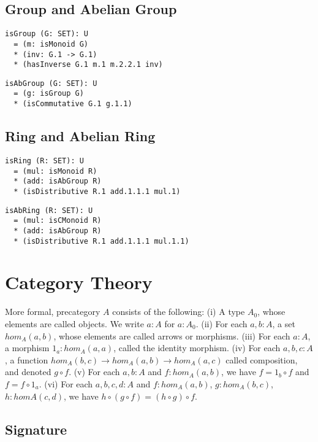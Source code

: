 \documentclass{article}
\begin{document}
\subsection{Group and Abelian Group}

\begin{lstlisting}[mathescape=true]
isGroup (G: SET): U
  = (m: isMonoid G)
  * (inv: G.1 -> G.1)
  * (hasInverse G.1 m.1 m.2.2.1 inv)
\end{lstlisting}

\begin{lstlisting}[mathescape=true]
isAbGroup (G: SET): U
  = (g: isGroup G)
  * (isCommutative G.1 g.1.1)
\end{lstlisting}

\subsection{Ring and Abelian Ring}

\begin{lstlisting}[mathescape=true]
isRing (R: SET): U
  = (mul: isMonoid R)
  * (add: isAbGroup R)
  * (isDistributive R.1 add.1.1.1 mul.1)
\end{lstlisting}

\begin{lstlisting}[mathescape=true]
isAbRing (R: SET): U
  = (mul: isCMonoid R)
  * (add: isAbGroup R)
  * (isDistributive R.1 add.1.1.1 mul.1.1)
\end{lstlisting}

\newpage
\section{Category Theory}

More formal, precategory $A$ consists of the following:
(i)   A type $A_0$, whose elements are called objects. We write $a: A$ for $a: A_0$.
(ii)  For each $a,b: A$, a set $hom_A(a,b)$, whose elements are called arrows or morphisms.
(iii) For each $a: A$, a morphism $1_a : hom_A(a,a)$, called the identity morphism.
(iv)  For each $a,b,c: A$, a function $hom_A(b,c) \rightarrow hom_A(a,b) \rightarrow hom_A(a,c)$
      called composition, and denoted $g \circ f$.
(v)   For each $a,b: A$ and $f: hom_A(a,b)$, we have $f = 1_b \circ f$ and $f = f \circ 1_a$.
(vi)  For each $a,b,c,d: A$ and $f: hom_A(a,b)$, $g: hom_A(b,c)$, $h: homA(c,d)$,
      we have $h \circ (g \circ f ) = (h \circ g) \circ f$.

\subsection{Signature}
\end{document}
